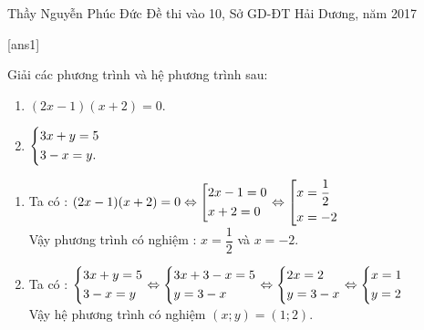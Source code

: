 \begin{name}
{Thầy  Nguyễn Phúc Đức}
{Đề thi vào 10, Sở GD-ĐT Hải Dương, năm 2017}
\end{name}
\setcounter{ex}{0}
[ans1]
\begin{ex}%
	Giải các phương trình và hệ phương trình sau: 
    \hfill
    \begin{multicols}{2}
     \begin{enumerate}[1)]
     	\item  $(2x-1)(x+2)=0$.
    	\item $\left\{\begin{aligned}&3x+y=5\\&3-x=y.\end{aligned}\right.$
    \end{enumerate}
    \end{multicols}
   
\loigiai
    {
    \begin{enumerate}[1)]
        \item Ta có : $(2x-1)(x+2)=0\Leftrightarrow \left[\begin{aligned}&2x-1=0\\&x+2=0\end{aligned}\right.\Leftrightarrow \left[\begin{aligned}&x=\dfrac{1}{2}\\&x=-2\end{aligned}\right.$\\
        Vậy phương trình có nghiệm : $x=\dfrac{1}{2}$ và $x=-2.$
        \item Ta có : $\left\{\begin{aligned}&3x+y=5\\&3-x=y\end{aligned}\right.\Leftrightarrow \left\{\begin{aligned}&3x+3-x=5\\&y=3-x\end{aligned}\right.\Leftrightarrow \left\{\begin{aligned}&2x=2\\&y=3-x\end{aligned}\right.\Leftrightarrow \left\{\begin{aligned}&x=1\\&y=2\end{aligned}\right.$\\
        Vậy hệ phương trình có nghiệm  $(x;y)=(1;2)$.
    \end{enumerate}
    }
\end{ex}

